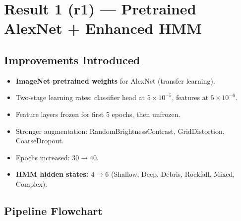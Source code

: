 \documentclass[12pt,a4paper]{article}
\begin{document}
\newpage
\section{Result 1 (r1) --- Pretrained AlexNet + Enhanced HMM}

\subsection{Improvements Introduced}
\begin{itemize}[nosep]
  \item \colorbox{newbox}{\textbf{ImageNet pretrained weights}} for AlexNet (transfer learning).
  \item Two-stage learning rates: classifier head at $5\times10^{-5}$, features at $5\times10^{-6}$.
  \item Feature layers frozen for first 5 epochs, then unfrozen.
  \item Stronger augmentation: RandomBrightnessContrast, GridDistortion, CoarseDropout.
  \item Epochs increased: $30 \to 40$.
  \item \colorbox{newbox}{\textbf{HMM hidden states: $4 \to 6$}} (Shallow, Deep, Debris, Rockfall, Mixed, Complex).
\end{itemize}

\subsection{Pipeline Flowchart}
\end{document}
